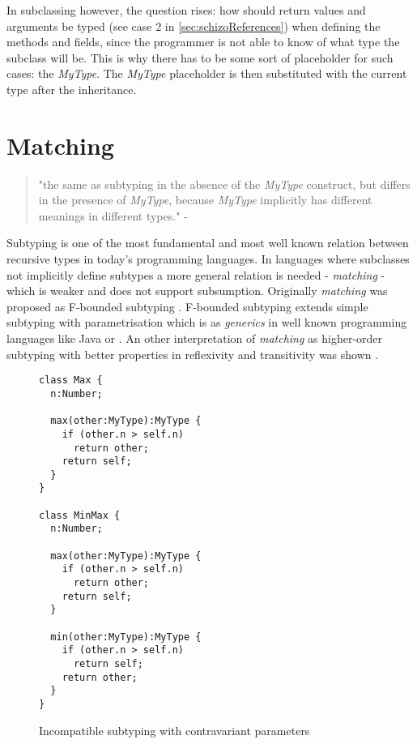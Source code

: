 In subclassing however, the question rises: how should return values
and arguments be typed (see case 2 in \ref{sec:schizoReferences})
when defining the methods and fields, since the programmer is not able
to know of what type the subclass will be. This is why there has to
be some sort of placeholder for such cases: the \emph{MyType}. The
\emph{MyType} placeholder is then substituted with the current type
after the inheritance.


\chapter{Matching}
\begin{quotation}
"the same as subtyping in the absence of the \emph{MyType}
construct, but differs in the presence of \emph{MyType}, because
\emph{MyType} implicitly has different meanings in different types." -
\cite{bruce_foundations_2002}
\end{quotation}

Subtyping is one of the most fundamental and most well known relation
between recursive types in today's programming languages. In languages
where subclasses not implicitly define subtypes a more general
relation is needed - \emph{matching} - which is weaker and does
not support subsumption. Originally \emph{matching} was proposed
as F-bounded subtyping \cite{canning_f-bounded_1989}. F-bounded
subtyping extends simple subtyping with parametrisation which is as
\emph{generics} in well known programming languages like Java or \CS
\cite{barron-estrada_inheritance_2003}. An other interpretation of
\emph{matching} as higher-order subtyping with better properties in
reflexivity and transitivity was shown \cite{abadi_subtyping_1996}.



\begin{figure}
\begin{lstlisting}
class Max {
  n:Number;

  max(other:MyType):MyType {
    if (other.n > self.n)
      return other;
    return self;
  }
}

class MinMax {
  n:Number;

  max(other:MyType):MyType {
    if (other.n > self.n)
      return other;
    return self;
  }

  min(other:MyType):MyType {
    if (other.n > self.n)
      return self;
    return other;
  }
}
\end{lstlisting}
\caption{Incompatible subtyping with contravariant parameters}
\label{fig:minmax-example}
\end{figure}

